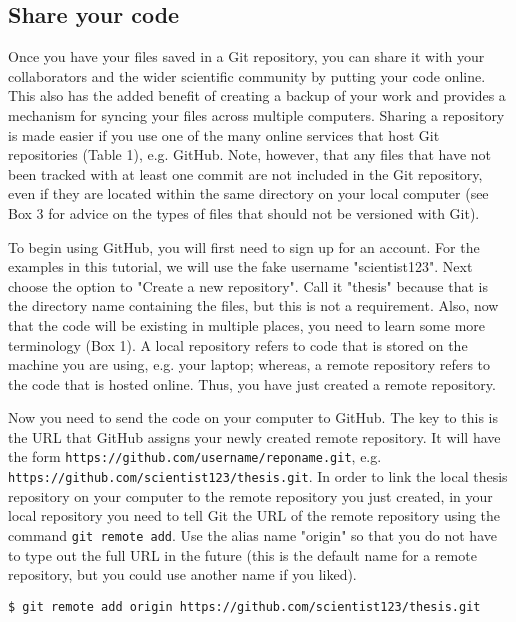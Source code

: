 \subsection{Share your code}

Once you have your files saved in a Git repository, you can share it with your collaborators and the wider scientific community by putting your code online.
This also has the added benefit of creating a backup of your work and provides a mechanism for syncing your files across multiple computers.
Sharing a repository is made easier if you use one of the many online services that host Git repositories (Table 1), e.g. GitHub.
Note, however, that any files that have not been tracked with at least one commit are not included in the Git repository, even if they are located within the same directory on your local computer (see Box 3 for advice on the types of files that should not be versioned with Git).

To begin using GitHub, you will first need to sign up for an account.
For the examples in this tutorial, we will use the fake username "scientist123".
Next choose the option to "Create a new repository".
Call it "thesis" because that is the directory name containing the files, but this is not a requirement.
Also, now that the code will be existing in multiple places, you need to learn some more terminology (Box 1).
A local repository refers to code that is stored on the machine you are using, e.g. your laptop; whereas, a remote repository refers to the code that is hosted online.
Thus, you have just created a remote repository.

Now you need to send the code on your computer to GitHub.
The key to this is the URL that GitHub assigns your newly created remote repository.
It will have the form \verb|https://github.com/username/reponame.git|, e.g. \verb|https://github.com/scientist123/thesis.git|.
In order to link the local thesis repository on your computer to the remote repository you just created, in your local repository you need to tell Git the URL of the remote repository using the command \verb|git remote add|.
Use the alias name "origin" so that you do not have to type out the full URL in the future (this is the default name for a remote repository, but you could use another name if you liked).

\begin{lstlisting}
$ git remote add origin https://github.com/scientist123/thesis.git
\end{lstlisting}

